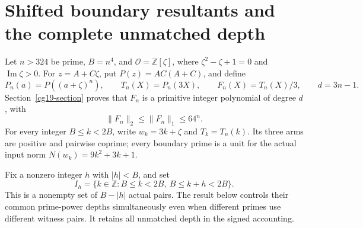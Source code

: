 \section{Shifted boundary resultants and the complete unmatched depth}
\label{srds-section}

Let \(n>324\) be prime, \(B=n^4\), and
\(\mathcal O=\mathbb Z[\zeta]\), where
\(\zeta^2-\zeta+1=0\) and \(\operatorname{Im}\zeta>0\).
For \(z=A+C\zeta\), put \(P(z)=AC(A+C)\), and define
\[
 P_n(a)=P((a+\zeta)^n),\qquad
 T_n(X)=P_n(3X),\qquad F_n(X)=T_n(X)/3,\qquad d=3n-1.
\]
Section~\ref{cg19-section} proves that \(F_n\) is a primitive
integer polynomial of degree \(d\), with
\[
 \|F_n\|_2\le\|F_n\|_1\le64^n.
\]
For every integer \(B\le k<2B\), write \(w_k=3k+\zeta\) and
\(T_k=T_n(k)\). Its three arms are positive and pairwise coprime;
every boundary prime is a unit for the actual input norm
\(N(w_k)=9k^2+3k+1\).

Fix a nonzero integer \(h\) with \(|h|<B\), and set
\[
 I_h=\{k\in\mathbb Z:B\le k<2B,\ B\le k+h<2B\}.
\]
This is a nonempty set of \(B-|h|\) actual pairs. The result below
controls their common prime-power depths simultaneously even when
different primes use different witness pairs. It retains all
unmatched depth in the signed accounting.

